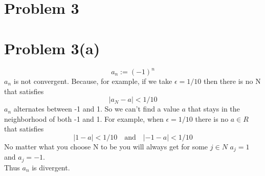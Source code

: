 \documentclass{article}
\begin{document}
\section*{Problem 3}

\section*{Problem 3(a)}
\[
   a_n := (-1)^n
\]
\(a_n\) is not convergent. Because, for example, if we take \(\epsilon = 1/10\) then there is no N that satisfies
\[
   |a_N - a| < 1/10
\]
\(a_n\) alternates between -1 and 1. So we can't find a value \(a\) that stays in the neighborhood of both -1 and 1.
For example, when \(\epsilon = 1/10\) there is no \(a \in R\) that satisfies
\[
   |1 - a| < 1/10 \quad \text{and} \quad |-1 - a| < 1/10
\]
No matter what you choose N to be you will always get for some \(j \in N\) \(a_j = 1\) and \(a_j = -1\). \\
Thus \(a_n\) is divergent.\\
\end{document}
